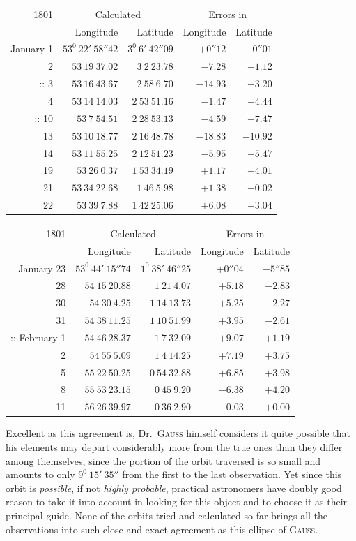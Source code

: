\begin{center}
{\small\setlength{\tabcolsep}{4pt}
\begin{tabular}{r|r|r|r|r}
1801&\multicolumn{2}{c|}{Calculated}&\multicolumn{2}{c}{Errors in}\\
&Longitude&Latitude&Longitude&Latitude\\\hline
January 1&$53^0\ 22'\ 58''42$&$3^0\ 6'\ 42''09$&$+0''12$&$-0''01$\\
2&$53\ 19\ 37.02$&$3\ 2\ 23.78$&$-7.28$&$-1.12$\\
$\mathord{:}\mathord{:}$ 3&$53\ 16\ 43.67$&$2\ 58\ 6.70$&$-14.93$&$-3.20$\\
4&$53\ 14\ 14.03$&$2\ 53\ 51.16$&$-1.47$&$-4.44$\\
$\mathord{:}\mathord{:}$ 10&$53\ 7\ 54.51$&$2\ 28\ 53.13$&$-4.59$&$-7.47$\\
13&$53\ 10\ 18.77$&$2\ 16\ 48.78$&$-18.83$&$-10.92$\\
14&$53\ 11\ 55.25$&$2\ 12\ 51.23$&$-5.95$&$-5.47$\\
19&$53\ 26\ 0.37$&$1\ 53\ 34.19$&$+1.17$&$-4.01$\\
21&$53\ 34\ 22.68$&$1\ 46\ 5.98$&$+1.38$&$-0.02$\\
22&$53\ 39\ 7.88$&$1\ 42\ 25.06$&$+6.08$&$-3.04$
\end{tabular}
\par\medskip
\begin{tabular}{r|r|r|r|r}
1801&\multicolumn{2}{c|}{Calculated}&\multicolumn{2}{c}{Errors in}\\
&Longitude&Latitude&Longitude&Latitude\\\hline
January 23&$53^0\ 44'\ 15''74$&$1^0\ 38'\ 46''25$&$+0''04$&$-5''85$\\
28&$54\ 15\ 20.88$&$1\ 21\ 4.07$&$+5.18$&$-2.83$\\
30&$54\ 30\ 4.25$&$1\ 14\ 13.73$&$+5.25$&$-2.27$\\
31&$54\ 38\ 11.25$&$1\ 10\ 51.99$&$+3.95$&$-2.61$\\
$\mathord{:}\mathord{:}$ February 1&$54\ 46\ 28.37$&$1\ 7\ 32.09$&$+9.07$&$+1.19$\\
2&$54\ 55\ 5.09$&$1\ 4\ 14.25$&$+7.19$&$+3.75$\\
5&$55\ 22\ 50.25$&$0\ 54\ 32.88$&$+6.85$&$+3.98$\\
8&$55\ 53\ 23.15$&$0\ 45\ 9.20$&$-6.38$&$+4.20$\\
11&$56\ 26\ 39.97$&$0\ 36\ 2.90$&$-0.03$&$+0.00$
\end{tabular}}
\end{center}
%
Excellent as this agreement is, Dr.\ \textsc{Gauss} himself considers it quite possible that his elements may depart considerably more from the true ones than they differ among themselves, since the portion of the orbit traversed is so small and amounts to only $9^0\ 15'\ 35''$ from the first to the last observation. Yet since this orbit is \textit{possible}, if not \textit{highly probable}, practical astronomers have doubly good reason to take it into account in looking for this object and to choose it as their principal guide. None of the orbits tried and calculated so far brings all the observations into such close and exact agreement as this ellipse of \textsc{Gauss}.

